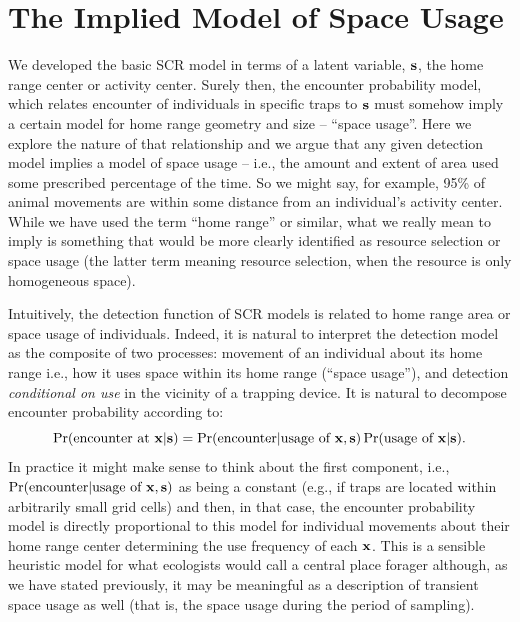 \section{The Implied Model of Space Usage}
\label{scr0.sec.implied}


We developed the basic SCR model in terms of a latent variable, ${\bf
  s}$, the home range center or activity center.  Surely then, the
encounter probability model, which relates encounter of individuals in
specific traps to ${\bf s}$ must somehow imply a certain model for
home range geometry and size -- ``space usage''.  Here we explore the
nature of that relationship and we argue that any given detection
model implies a model of space usage -- i.e., the amount and extent of
area used some prescribed percentage of the time. So we might say,
for example, 95\% of animal movements are within some distance from an
individual's activity center.  While we have used the term ``home
range'' or similar, what we really mean to imply is something that
would be more clearly identified as
resource selection or space usage (the latter term meaning resource
selection, when the resource is only homogeneous space).

Intuitively, the detection function of SCR models is related to home
range area or space usage of individuals.  Indeed, it is natural
to interpret the detection model as the composite of two processes:
movement of an individual about its home range i.e., how it uses space
within its home range (``space usage''), and detection {\it
  conditional on use} in the vicinity of a trapping device.
It is natural to decompose encounter probability according to:
\[
 \Pr(\mbox{encounter at } {\bf x}|{\bf s})
 = \Pr(\mbox{encounter}| \mbox{usage of } {\bf x}, {\bf s})
\Pr(\mbox{usage of } {\bf x}|{\bf s}).
\]
In practice it might make sense to think about the first component, \newline
i.e., $\Pr(\mbox{encounter} | \mbox{usage of } {\bf x}, {\bf s})$ as
being a constant (e.g., if traps are located within arbitrarily small
grid cells) and then, in that case, the encounter probability model is
directly proportional to this model for individual movements about
their home range center determining the use frequency of each ${\bf x}$.
This is a sensible heuristic model for what ecologists would call a
central place forager although, as we have stated previously, it may
be meaningful as a description of transient space usage as well (that
is, the space usage during the period of sampling).

